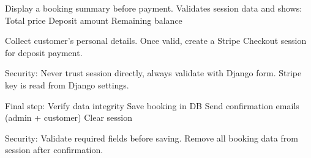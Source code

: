 \documentclass[letterpaper,10pt,french]{sphinxmanual}
\begin{document}

\begin{fulllineitems}
\label{\detokenize{index:bookings.views.booking_summary}}
\pysigstartsignatures
\pysiglinewithargsret
{}
{}
{}
\pysigstopsignatures
\sphinxAtStartPar
Display a booking summary before payment.
Validates session data and shows:
\sphinxhyphen{} Total price
\sphinxhyphen{} Deposit amount
\sphinxhyphen{} Remaining balance

\end{fulllineitems}


\begin{fulllineitems}
\label{\detokenize{index:bookings.views.booking_details}}
\pysigstartsignatures
\pysiglinewithargsret
{}
{}
{}
\pysigstopsignatures
\sphinxAtStartPar
Collect customer’s personal details.
Once valid, create a Stripe Checkout session for deposit payment.

\sphinxAtStartPar
Security:
\sphinxhyphen{} Never trust session directly, always validate with Django form.
\sphinxhyphen{} Stripe key is read from Django settings.

\end{fulllineitems}


\begin{fulllineitems}
\label{\detokenize{index:bookings.views.booking_confirm}}
\pysigstartsignatures
\pysiglinewithargsret
{}
{}
{}
\pysigstopsignatures
\sphinxAtStartPar
Final step:
\sphinxhyphen{} Verify data integrity
\sphinxhyphen{} Save booking in DB
\sphinxhyphen{} Send confirmation emails (admin + customer)
\sphinxhyphen{} Clear session

\sphinxAtStartPar
Security:
\sphinxhyphen{} Validate required fields before saving.
\sphinxhyphen{} Remove all booking data from session after confirmation.

\end{fulllineitems}
\end{document}
